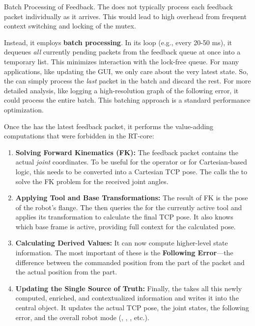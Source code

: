 \begin{tipbox}{Batch Processing of Feedback.}
    The  does not typically process each feedback packet individually as it arrives. This would lead to high overhead from frequent context switching and locking of the  mutex.
    
    Instead, it employs \textbf{batch processing}. In its loop (e.g., every 20-50 ms), it dequeues \textit{all} currently pending packets from the feedback queue at once into a temporary list. This minimizes interaction with the lock-free queue. For many applications, like updating the GUI, we only care about the very latest state. So, the  can simply process the \textit{last} packet in the batch and discard the rest. For more detailed analysis, like logging a high-resolution graph of the following error, it could process the entire batch. This batching approach is a standard performance optimization.
\end{tipbox}

Once the  has the latest feedback packet, it performs the value-adding computations that were forbidden in the RT-core:
\begin{enumerate}
    \item \textbf{Solving Forward Kinematics (FK):} The feedback packet contains the actual \textit{joint} coordinates. To be useful for the operator or for Cartesian-based logic, this needs to be converted into a Cartesian TCP pose. The  calls the  to solve the FK problem for the received joint angles.
    
    \item \textbf{Applying Tool and Base Transformations:} The result of FK is the pose of the robot's flange. The  then queries the  for the currently active tool and applies its transformation to calculate the final TCP pose. It also knows which base frame is active, providing full context for the calculated pose.
    
    \item \textbf{Calculating Derived Values:} It can now compute higher-level state information. The most important of these is the \textbf{Following Error}—the difference between the commanded position from the  part of the packet and the actual position from the  part.
    
    \item \textbf{Updating the Single Source of Truth:} Finally, the  takes all this newly computed, enriched, and contextualized information and writes it into the central  object. It updates the actual TCP pose, the joint states, the following error, and the overall robot mode (, , , etc.).
\end{enumerate}

